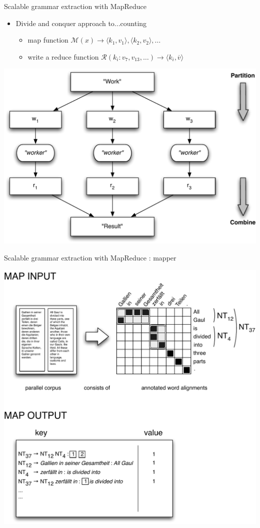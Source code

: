 \documentclass{beamer}
\begin{document}
\begin{frame}[t]{Scalable grammar extraction with MapReduce}
\begin{itemize}
\item Divide and conquer approach to...counting
\begin{itemize}
\item map function $\mathcal{M}(x) \rightarrow \langle k_1, v_1 \rangle, \langle k_2, v_2 \rangle, \ldots$
\item write a reduce function $\mathcal{R}(k_i : v_7, v_{13} , \ldots) \rightarrow \langle k_i, \overline{v} \rangle$
\end{itemize}
\end{itemize}
\begin{center}
  \includegraphics[scale=0.4]{mroutline.pdf}
\end{center}
\end{frame}
\begin{frame}[t]{Scalable grammar extraction with MapReduce : mapper}
\begin{center}
  \includegraphics[scale=0.4]{mapper.pdf}
\end{center}
\end{frame}
\end{document}
